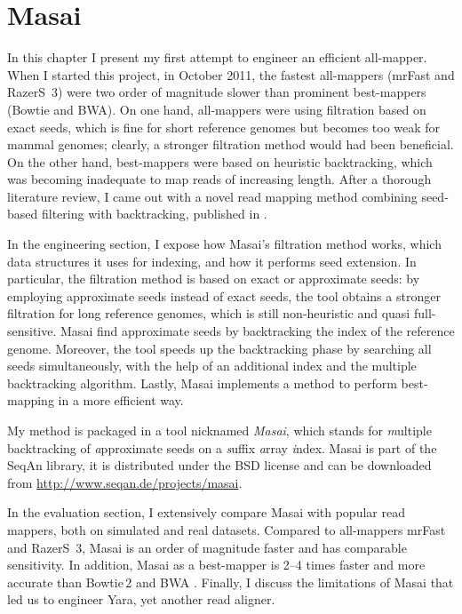 \chapter{Masai}
\label{sec:masai}

In this chapter I present my first attempt to engineer an efficient all-mapper.
When I started this project, in October 2011, the fastest all-mappers (mrFast and RazerS~3) were two order of magnitude slower than prominent best-mappers (Bowtie and BWA).
On one hand, all-mappers were using filtration based on exact seeds, which is fine for short reference genomes but becomes too weak for mammal genomes; clearly, a stronger filtration method would had been beneficial.
On the other hand, best-mappers were based on heuristic backtracking, which was becoming inadequate to map reads of increasing length.
After a thorough literature review, I came out with a novel read mapping method combining seed-based filtering with backtracking, published in \citep{Siragusa2013}.

In the engineering section, I expose how Masai's filtration method works, which data structures it uses for indexing, and how it performs seed extension.
In particular, the filtration method is based on exact or approximate seeds: by employing approximate seeds instead of exact seeds, the tool obtains a stronger filtration for long reference genomes, which is still non-heuristic and quasi full-sensitive.
Masai find approximate seeds by backtracking the index of the reference genome.
Moreover, the tool speeds up the backtracking phase by searching all seeds simultaneously, with the help of an additional index and the multiple backtracking algorithm.
Lastly, Masai implements a method to perform best-mapping in a more efficient way.

My method is packaged in a \CC tool nicknamed \emph{Masai}, which stands for \emph{m}ultiple backtracking of \emph{a}pproximate seeds on a \emph{s}uffix \emph{a}rray \emph{i}ndex.
Masai is part of the SeqAn library, it is distributed under the BSD license and can be downloaded from \url{http://www.seqan.de/projects/masai}.

In the evaluation section, I extensively compare Masai with popular read mappers, both on simulated and real datasets.
Compared to all-mappers mrFast and RazerS~3, Masai is an order of magnitude faster and has comparable sensitivity.
In addition, Masai as a best-mapper is 2--4 times faster and more accurate than Bowtie\,2 \citep{Langmead2012} and BWA \citep{Li2009}.
Finally, I discuss the limitations of Masai that led us to engineer Yara, yet another read aligner.

